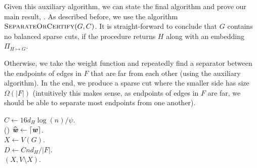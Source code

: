 Given this auxiliary algorithm, we can state the final algorithm and prove our main result, . As described before, we use the algorithm $\textsc{SeparateOrCertify}(G, C)$. It is straight-forward to conclude that $G$ contains no balanced sparse cuts, if the procedure returns $H$ along with an embedding $\Pi_{H \mapsto G}$.

Otherwise, we take the weight function and repeatedly find a separator between the endpoints of edges in $F$ that are far from each other (using the auxiliary algorithm). In the end, we produce a sparse cut where the smaller side has size $\Omega(|F|)$ (intuitively this makes sense, as endpoints of edges in $F$ are far, we should be able to separate most endpoints from one another).

\begin{algorithm}
$C \gets 16 d_H \log(n)/\psi$.\\
\Else(){
    $\widehat{\boldsymbol{\mathit{w}}} \gets \lceil \boldsymbol{{\mathit{w}}} \rceil$. \\
    $X \gets V(G)$.\\
    $D \gets {C n d_H}/{|F|}$.\\
    \Return $(X, V \setminus X)$. \label{lne:returnSparseCut}
}
\caption{$\textsc{SparseCutOrCertify}(G, \psi, b)$}\label{alg:mainAlgo}
\end{algorithm}

\APSPreduction*

